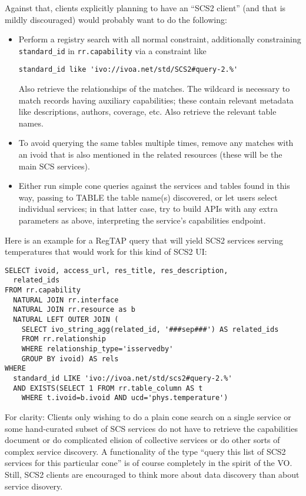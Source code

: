 \documentclass[11pt,a4paper]{ivoa}
\begin{document}
Against that, clients explicitly planning to have an ``SCS2 client''
(and that is mildly discouraged) would probably want to do the
following:

\begin{itemize}
\item Perform a registry search with all normal constraint, additionally
constraining \verb|standard_id| in \verb|rr.capability| via a constraint
like
\begin{lstlisting}
standard_id like 'ivo://ivoa.net/std/SCS2#query-2.%'
\end{lstlisting}
Also retrieve the relationships of the matches.  The wildcard is
necessary to match records having auxiliary capabilities; these contain
relevant metadata like descriptions, authors, coverage, etc.  Also
retrieve the relevant table names.

\item To avoid querying the same tables multiple times, remove any
matches with an ivoid that is also mentioned in the related resources
(these will be the main SCS services).

\item Either run simple cone queries against the services and tables
found in this way, passing to TABLE the table name(s) discovered, or let
users select individual services; in that latter case, try to build APIs
with any extra parameters as above, interpreting the service's
capabilities endpoint.
\end{itemize}

Here is an example for a RegTAP query that will yield SCS2 services
serving temperatures that would work for this kind of SCS2 UI:

\begin{lstlisting}
SELECT ivoid, access_url, res_title, res_description,
  related_ids
FROM rr.capability
  NATURAL JOIN rr.interface
  NATURAL JOIN rr.resource as b
  NATURAL LEFT OUTER JOIN (
    SELECT ivo_string_agg(related_id, '###sep###') AS related_ids
    FROM rr.relationship
    WHERE relationship_type='isservedby'
    GROUP BY ivoid) AS rels
WHERE
  standard_id LIKE 'ivo://ivoa.net/std/scs2#query-2.%'
  AND EXISTS(SELECT 1 FROM rr.table_column AS t
    WHERE t.ivoid=b.ivoid AND ucd='phys.temperature')
\end{lstlisting}

For clarity: Clients only wishing to do a plain cone search on a single
service or some hand-curated subset of SCS services do not have to
retrieve the capabilities document or do complicated elision of
collective services or do other sorts of complex service discovery.  A
functionality of the type ``query this list of SCS2 services for this
particular cone'' is of course completely in the spirit of the VO.
Still, SCS2 clients are encouraged to think more about data discovery
than about service disovery.
\end{document}
